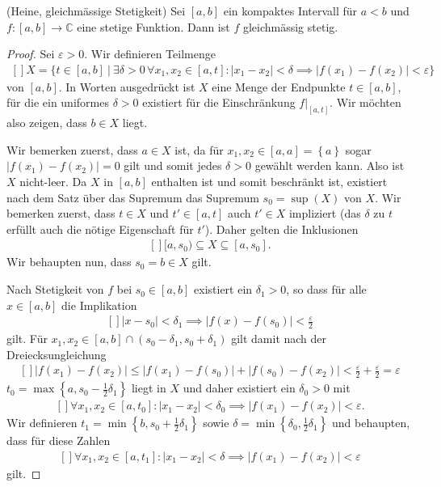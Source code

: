 \documentclass[../Analysis1_script.tex]{subfiles}
\begin{document}
\begin{proposition}{(Heine, gleichmässige Stetigkeit)}
	Sei $[a, b]$ ein kompaktes Intervall für $a < b$ und $f : [a, b] \to \mathbb{C}$ eine stetige Funktion. Dann ist $f$ gleichmässig stetig.
\end{proposition}

\begin{proof}
	Sei $\varepsilon > 0$. Wir definieren Teilmenge
	\[\begin{aligned}[]
		X = \Big \lbrace t \in [a,b]\ \Big | \ \exists \delta > 0\, \forall x_1,x_2 \in [a,t]: |x_1-x_2| < \delta \implies |f(x_1)-f(x_2)|<\varepsilon \Big \rbrace
	\end{aligned}\]
	von $[a, b]$. In Worten ausgedrückt ist $X$ eine Menge der Endpunkte $t \in [a, b]$, für die ein uniformes $\delta > 0$ existiert für die Einschränkung $f|_{[a, t]}$. Wir möchten also zeigen, dass $b \in X$ liegt.
	
	Wir bemerken zuerst, dass $a \in X$ ist, da für $x_1,x_2 \in [a,a] = \left \lbrace {a} \right \rbrace$ sogar $|f(x_1)-f(x_2)| = 0$ gilt und somit jedes $\delta > 0$ gewählt werden kann. Also ist $X$ nicht-leer. Da $X$ in $[a,b]$ enthalten ist und somit beschränkt ist, existiert nach dem Satz über das Supremum das Supremum $s_0 = \sup (X)$ von $X$. Wir bemerken zuerst, dass $t \in X$ und $t' \in [a,t]$ auch $t' \in X$ impliziert (das $\delta$ zu $t$ erfüllt auch die nötige Eigenschaft für $t'$). Daher gelten die Inklusionen 
	\[\begin{aligned}[]\label{eq:FktR-proofunifcontoncomp.1} 
		[a,s_0) \subseteq X \subseteq [a,s_0].
	\end{aligned}\]
	Wir behaupten nun, dass $s_0 = b \in X$ gilt. 
	
	Nach Stetigkeit von $f$ bei $s_0 \in [a,b]$ existiert ein $\delta _1 >0$, so dass für alle $x\in [a,b]$ die Implikation
	\[\begin{aligned}[]
		|x-s_0| < \delta _1 \implies |f(x)-f(s_0)| < \frac {\varepsilon }{2}
	\end{aligned}\]
	gilt. Für $x_1,x_2 \in [a,b] \cap (s_0-\delta _1,s_0+\delta _1)$ gilt damit nach der Dreiecksungleichung
	\[\begin{aligned}[]\label{eq:FktR-proofunifcontoncomp.2} 
		|f(x_1)-f(x_2)| \leq |f(x_1)-f(s_0)| + |f(s_0)-f(x_2)| < \frac {\varepsilon }{2} + \frac {\varepsilon }{2} = \varepsilon
	\end{aligned}\]
	$t_0 = \max \left \lbrace {a,s_0-\frac {1}{2} \delta _1} \right \rbrace$ liegt in $X$ und daher existiert ein $\delta _0 > 0$ mit
	\[\begin{aligned}[]\label{eq:FktR-proofunifcontoncomp.3} 
		\forall x_1,x_2 \in [a,t_0]: |x_1-x_2| < \delta _0 \implies |f(x_1)-f(x_2)| <\varepsilon .
	\end{aligned}\]
	 Wir definieren $t_1 = \min \left \lbrace {b,s_0+ \frac {1}{2} \delta _1} \right \rbrace$ sowie $\delta = \min \left \lbrace {\delta _0,\frac {1}{2} \delta _1} \right \rbrace$ und behaupten, dass für diese Zahlen
	\[\begin{aligned}[]\label{eq:FktR-proofunifcontoncomp.4} 
		\forall x_1,x_2 \in [a,t_1]: |x_1-x_2| < \delta \implies |f(x_1)-f(x_2)| <\varepsilon
	\end{aligned}\]
	gilt.
	

\end{proof}
\end{document}
